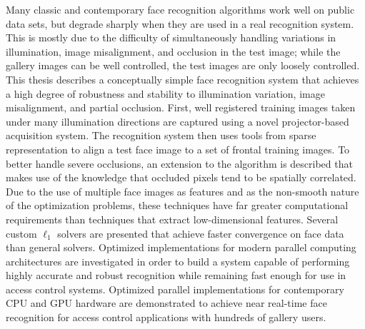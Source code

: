 Many classic and contemporary face recognition algorithms work well on public
data sets, but degrade sharply when they are used in a real recognition system.
This is mostly due to the difficulty of simultaneously handling variations in
illumination, image misalignment, and occlusion in the test image;
while the gallery images can be well controlled, the test
images are only loosely controlled.  
This thesis describes a conceptually simple face
recognition system that achieves a high degree of robustness and stability to
illumination variation, image misalignment, and partial occlusion.  First, well
registered training images taken under many illumination directions are
captured using a novel projector-based acquisition system.  The recognition
system then uses tools from sparse representation to align a test face image to
a set of frontal training images.  To better handle severe occlusions, an
extension to the algorithm is described that makes use of the knowledge that
occluded pixels tend to be spatially correlated.  Due to the use of multiple
face images as features and as the non-smooth nature of the optimization
problems, these techniques have far greater computational requirements than
techniques that extract low-dimensional features.  Several custom $\ell_1$
solvers are presented that achieve faster convergence on face data than general
solvers.  Optimized implementations for modern parallel computing architectures
are investigated in order to build a system capable of performing highly
accurate and robust recognition while remaining fast enough for use in access
control systems.  Optimized parallel implementations for contemporary CPU and
GPU hardware are demonstrated to achieve near real-time face recognition for
access control applications with hundreds of gallery users.



